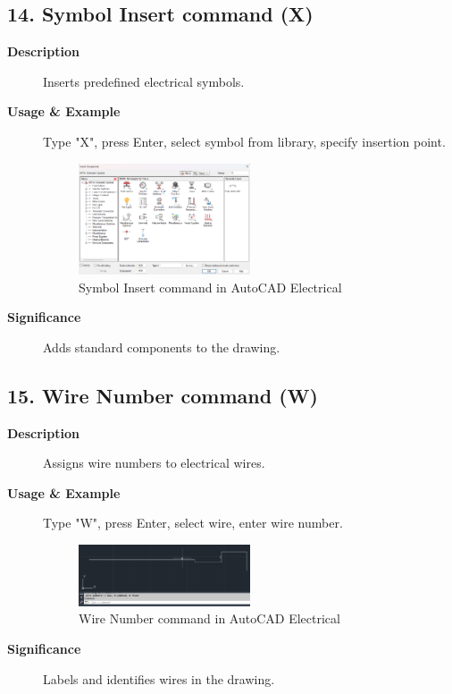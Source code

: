 \documentclass[12pt]{article}
\begin{document}
\subsection*{14. Symbol Insert command (X)}
\begin{description}
    \item [\textbf{Description}] Inserts predefined electrical symbols.
    \item [\textbf{Usage \& Example}] Type "X", press Enter, select symbol from library, specify insertion point.
          \begin{figure}[H]
              \centering
              \includegraphics[width=0.5\textwidth]{symbol_insert_command.png}
              \caption{Symbol Insert command in AutoCAD Electrical}
          \end{figure}
    \item [\textbf{Significance}] Adds standard components to the drawing.
\end{description}

\subsection*{15. Wire Number command (W)}
\begin{description}
    \item [\textbf{Description}] Assigns wire numbers to electrical wires.
    \item [\textbf{Usage \& Example}] Type "W", press Enter, select wire, enter wire number.
          \begin{figure}[H]
              \centering
              \includegraphics[width=0.5\textwidth]{wire_number_command.png}
              \caption{Wire Number command in AutoCAD Electrical}
          \end{figure}
    \item [\textbf{Significance}] Labels and identifies wires in the drawing.
\end{description}
\end{document}
